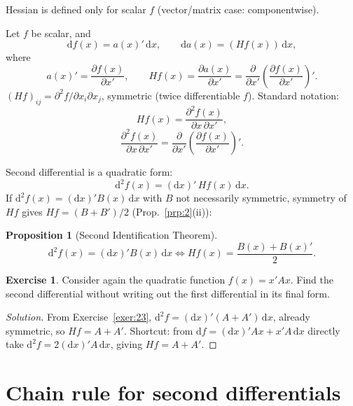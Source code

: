 \documentclass[14pt]{extarticle}
\theoremstyle{plain}
\newtheorem{proposition}{Proposition}
\theoremstyle{definition}
\newtheorem{exercise}{Exercise}
\theoremstyle{remark}
\newenvironment{solution}{%
  \begin{proof}[Solution]%
}{%
  \end{proof}%
}
\newcommand{\dd}{\mathrm{d}}
\begin{document}
Hessian is defined only for scalar $f$ (vector/matrix case: componentwise).

Let $f$ be scalar, and
\begin{equation}\label{eq:37}
\dd f(x) = a(x)'\, \dd x, \qquad \dd a(x) = (Hf(x))\, \dd x,
\end{equation}
where
\[
a(x)' = \frac{\partial f(x)}{\partial x'}, \qquad
Hf(x) = \frac{\partial a(x)}{\partial x'} = \frac{\partial}{\partial x'} \left(\frac{\partial f(x)}{\partial x'}\right)'.
\]
$(Hf)_{ij} = \partial^2 f/\partial x_i \partial x_j$, symmetric (twice differentiable $f$). Standard notation:
\begin{equation}\label{eq:38}
Hf(x) = \frac{\partial^2 f(x)}{\partial x\, \partial x'},
\end{equation}
\begin{equation}\label{eq:39}
\frac{\partial^2 f(x)}{\partial x\, \partial x'} = \frac{\partial}{\partial x'} \left(\frac{\partial f(x)}{\partial x'}\right)'.
\end{equation}

Second differential is a quadratic form:
\begin{equation}\label{eq:40}
\dd^2 f(x) = (\dd x)'\, Hf(x)\, \dd x.
\end{equation}
If $\dd^2 f(x) = (\dd x)' B(x)\,\dd x$ with $B$ not necessarily symmetric, symmetry of $Hf$ gives $Hf = (B + B')/2$ (Prop.~\ref{prp:2}(ii)):

\begin{proposition}[Second Identification Theorem]\label{prp:13}
\[
\dd^2 f(x) = (\dd x)' B(x)\, \dd x \iff Hf(x) = \frac{B(x) + B(x)'}{2}.
\]
\end{proposition}

\begin{exercise}\label{exer:25}
Consider again the quadratic function $f(x) = x'Ax$. Find the second differential without writing out the first differential in its final form.
\end{exercise}

\begin{solution}
From Exercise~\ref{exer:23}, $\dd^2 f = (\dd x)'(A+A')\,\dd x$, already symmetric, so $Hf = A + A'$. Shortcut: from $\dd f = (\dd x)'Ax + x'A\,\dd x$ directly take $\dd^2 f = 2(\dd x)'A\,\dd x$, giving $Hf = A + A'$.
\end{solution}

\section{Chain rule for second differentials}\label{sec:10}
\end{document}
